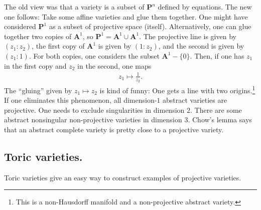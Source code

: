 \documentclass [11 pt, oneside] {article}
\begin{document}
The old view was that a variety is a subset of $\mathbf{P}^n$ defined by equations. The new one follows: Take some affine varieties and glue them together. One might have considered $\mathbf{P}^1$ as a subset of projective space (itself). Alternatively, one can glue together two copies of $\mathbf{A}^1$, so $\mathbf{P}^1=\mathbf{A}^1\cup \mathbf{A}^1$. The projective line is given by $(z_1:z_2)$, the first copy of $\mathbf{A}^1$ is given by $(1:z_2)$, and the second is given by $(z_1:1)$. For both copies, one considers the subset $\mathbf{A}^1-\{0\}$. Then, if one has $z_1$ in the first copy and $z_2$ in the second, one maps
\begin{align*}
	z_1\longmapsto \frac{1}{z_2}.
\end{align*}
The ``gluing'' given by $z_1\longmapsto z_2$ is kind of funny: One gets a line with two origins.\footnote{This is a non-Hausdorff manifold and a non-projective abstract variety.} If one eliminates this phenomenon, all dimension-$1$ abstract varieties are projective. One needs to exclude singularities in dimension $2$. There are some abstract nonsingular non-projective varieties in dimension $3$. Chow's lemma says that an abstract complete variety is pretty close to a projective variety. 

\subsection{Toric varieties.}
Toric varieties give an easy way to construct examples of projective varieties.
\end{document}
